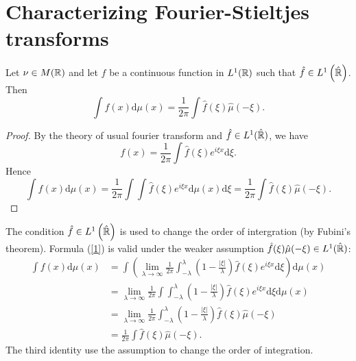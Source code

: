 \section{Characterizing Fourier-Stieltjes transforms}

\begin{theorem}
  Let $\nu \in M(\mathbb{R})$ and let $f$ be a continuous function in $L^1(\mathbb{R})$ such that $\hat{f}\in L^1\left( \hat{\mathbb{R}} \right) $. Then
  \begin{equation}
    \int f(x)\mathrm{d}\mu(x)=\frac{1}{2\pi}\int \hat{f}(\xi)\hat{\mu}(-\xi).\label{1}
  \end{equation}
\end{theorem}

\begin{proof}
  By the theory of usual fourier transform and $\hat{f}\in L^1(\hat{\mathbb{R}})$, we have
  \[
    f(x)=\frac{1}{2\pi}\int\hat{f}(\xi) e^{i\xi x}\mathrm{d}\xi.
  \]
  Hence
  \[
    \int f(x)\mathrm{d}\mu(x)=\frac{1}{2\pi}\int\int \hat{f}(\xi)e^{i\xi x}\mathrm{d}\mu(x)\mathrm{d}\xi=\frac{1}{2\pi}\int \hat{f}(\xi)\hat{\mu}(-\xi).
  \] 
\end{proof}
The condition $\hat{f}\in L^1\left( \hat{\mathbb{R}} \right) $ is used to change the order of intergration (by Fubini's theorem).
Formula (\ref{1}) is valid under the weaker assumption $\hat{f}(\xi)\hat{\mu}(-\xi) \in L^1(\hat{\mathbb{R}})$:
\begin{align*}
  \int f(x) \mathrm{d}\mu(x)&=\int\left(\lim_{\lambda\to \infty} \frac{1}{2\pi}\int_{-\lambda}^{\lambda}\left( 1-\frac{|\xi|}{\lambda} \right) \hat{f}(\xi) e^{i\xi x}\mathrm{d}\xi\right)\mathrm{d}\mu(x)\\
  &=\lim_{\lambda\to \infty}\frac{1}{2\pi}\int \int_{-\lambda}^{\lambda}\left( 1-\frac{|\xi|}{\lambda} \right) \hat{f}(\xi)e^{i\xi x}\mathrm{d}\xi \mathrm{d}\mu(x)\\
  &= \lim_{\lambda\to \infty}\frac{1}{2\pi}\int_{-\lambda}^{\lambda}\left( 1-\frac{|\xi|}{\lambda} \right)\hat{f}(\xi)\hat{\mu}(-\xi)\\
  &= \frac{1}{2\pi}\int \hat{f}(\xi)\hat{\mu}(-\xi)
.\end{align*}
The third identity use the assumption to change the order of integration.

